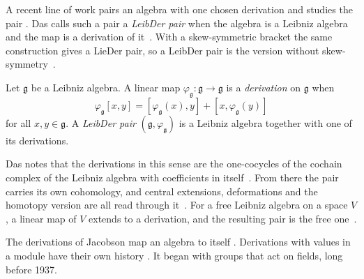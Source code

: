 A recent line of work pairs an algebra with one chosen derivation and studies
the pair \cite[\S 3, p.~4]{Das2021LeibDer}. Das calls such a pair a
\emph{LeibDer pair} when the algebra is a Leibniz algebra and the map is a
derivation of it~\cite[\S 3, p.~4]{Das2021LeibDer}. With a skew-symmetric
bracket the same construction gives a LieDer pair, so a LeibDer pair is the
version without skew-symmetry~\cite[\S 3, p.~4]{Das2021LeibDer}.

\begin{definition}\label{def:origins:leibder}
Let $\mathfrak{g}$ be a Leibniz algebra. A linear map
$\varphi_{\mathfrak{g}}\colon \mathfrak{g} \to \mathfrak{g}$ is a
\emph{derivation} on $\mathfrak{g}$ when
\[
  \varphi_{\mathfrak{g}}[x, y] = [\varphi_{\mathfrak{g}}(x), y]
  + [x, \varphi_{\mathfrak{g}}(y)]
\]
for all $x, y \in \mathfrak{g}$. A \emph{LeibDer pair}
$(\mathfrak{g}, \varphi_{\mathfrak{g}})$ is a Leibniz algebra together with
one of its derivations.
\end{definition}

Das notes that the derivations in this sense are the one-cocycles of the
cochain complex of the Leibniz algebra with coefficients in
itself~\cite[\S 3, p.~4]{Das2021LeibDer}. From there the pair carries its own
cohomology, and central extensions, deformations and the homotopy version are
all read through it~\cite[p.~1]{Das2021LeibDer}. For a free Leibniz algebra on
a space $V$, a linear map of $V$ extends to a derivation, and the resulting
pair is the free one~\cite[Proposition~3.4, p.~5]{Das2021LeibDer}.

The derivations of Jacobson map an algebra to itself
\cite[p.~206]{Jacobson1937}. Derivations with values in a module have their
own history \cite[p.~206]{Jacobson1937}. It began with groups that act on
fields, long before 1937.
